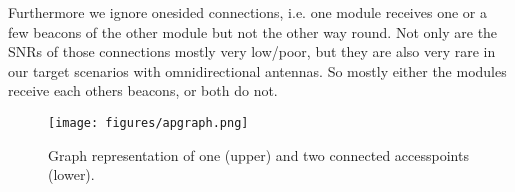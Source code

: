     Furthermore we ignore onesided connections, i.e. one module receives one or a few beacons of the other module but not the other way round.
    Not only are the SNRs of those connections mostly very low/poor, but they are also very rare in our target scenarios with omnidirectional antennas.
    So mostly either the modules receive each others beacons, or both do not.
    
    \begin{figure}[th!]
      \centering
      \texttt{[image: figures/apgraph.png]}
      \caption{Graph representation of one (upper) and two connected accesspoints (lower).}
      \label{fig:apgraph}
    \end{figure}
